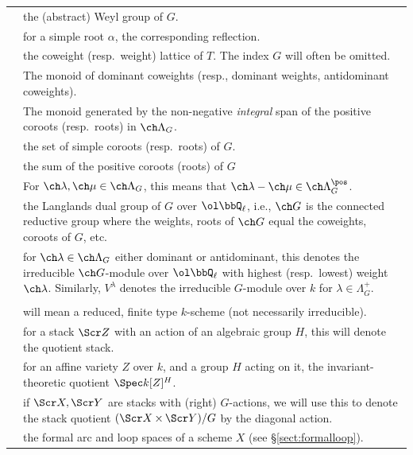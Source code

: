 \documentclass[final]{amsart}
\theoremstyle{remark}
\theoremstyle{definition}
\DeclareMathOperator*{\xt}{\times}
\numberwithin{equation}{section}
\begin{document}
\begin{longtable}{>{\raggedleft}p{} p{} }
{$W$} & {the (abstract) Weyl group of $G$.} \\
{$s_\alpha \in W$} & {for a simple root $\alpha$, the corresponding reflection.} \\
{$\check \Lambda_G$ ($\Lambda_G$)} & {the coweight (resp.~weight) lattice of $T$. The index $G$ will often be omitted.} \\
{$\check\Lambda^+_G$ ($\Lambda_G^+,\, \ch\Lambda^-_G$)} & 
The monoid of dominant coweights (resp., dominant weights, antidominant coweights). \\
{$\ch\Lambda^\pos_G$ ($\Lambda^\pos_G \subset \Lambda_G$)} & 
The monoid generated by the non-negative \emph{integral} span of the positive coroots
(resp.~roots) in $\ch\Lambda_G$.  \\
{$\check\Delta_G$ ($\Delta_G$)} & {the set of simple coroots (resp.~roots)
of $G$.} \\
{$2\ch\rho_G \in \ch\Lambda_G$ ($2\rho_G \in \Lambda_G$)} & {the sum of 
the positive coroots (roots) of $G$} \\
{$\ch\lambda \ge \ch\mu$} & {For $\ch\lambda,\ch\mu \in \ch\Lambda_G$, this means that $\ch\lambda - \ch\mu \in \ch\Lambda^\pos_G$.} \\
{$\ch G$} & {the Langlands dual group of $G$ over $\ol\bbQ_\ell$, i.e., $\ch G$ is
the connected reductive group where the weights, roots of $\ch G$ equal the 
coweights, coroots of $G$, etc.} \\
{$V^{\ch\lambda}$} & {for $\ch\lambda \in \ch\Lambda_G$ either dominant or antidominant, this denotes
the irreducible $\ch G$-module over $\ol\bbQ_\ell$
with highest (resp.~lowest) weight $\ch\lambda$.
Similarly, $V^\lambda$ denotes the irreducible $G$-module over $k$ for $\lambda\in \Lambda_G^+$.}
\\
& \\
{variety} & {will mean a reduced, finite type $k$-scheme (not necessarily irreducible).}  \\
{$\Scr Z/H$} & {for a stack $\Scr Z$ with an action of an algebraic group $H$, this will denote the quotient stack.} \\
{$Z\sslash H$} & {for an affine variety $Z$ over $k$, and a group $H$ acting on it, the invariant-theoretic quotient $\Spec k[Z]^H$.} \\ 
{$\Scr X \xt^G \Scr Y$} & 
if $\Scr X, \Scr Y$ are stacks with (right) $G$-actions, we will use  this 
to denote the stack quotient $(\Scr X \xt \Scr Y)/G$ by the diagonal action. \\
{$\msf L^+ X,\, \msf L X$} & {the formal arc and loop spaces of a scheme $X$ (see \S \ref{sect:formalloop}).} 

\end{longtable}
\end{document}

